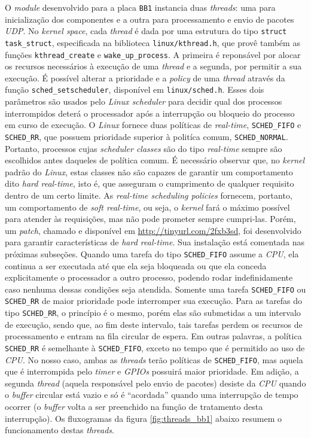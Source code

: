 O \textit{module} desenvolvido para a placa \texttt{BB1} instancia duas
\textit{threads}: uma para inicialização dos componentes e a outra para
processamento e envio de pacotes \textit{UDP}. No \textit{kernel space}, cada
\textit{thread} é dada por uma estrutura do tipo \texttt{struct task\_struct},
especificada na biblioteca \texttt{linux/kthread.h}, que provê também as funções
\texttt{kthread\_create} e \texttt{wake\_up\_process}. A primeira é reponsável
por alocar os recursos necessários à execução de uma \textit{thread} e a
segunda, por permitir a sua execução. É possível alterar a prioridade e a
\textit{policy} de uma \textit{thread} através da função
\texttt{sched\_setscheduler}, disponível em \texttt{linux/sched.h}. Esses dois
parâmetros são usados pelo \textit{Linux scheduler} para decidir qual dos
processos interrompidos deterá o processador após a interrupção ou bloqueio do
processo em curso de execução. O \textit{Linux} fornece duas políticas de
\textit{real-time}, \texttt{SCHED\_FIFO} e \texttt{SCHED\_RR}, que possuem
prioridade superior à politíca comum, \texttt{SCHED\_NORMAL}. Portanto,
processos cujas \textit{scheduler classes} são do tipo \textit{real-time} sempre
são escolhidos antes daqueles de política comum. É necessário observar que,  no
\textit{kernel} padrão do \textit{Linux},  estas classes não são capazes de garantir um comportamento dito \textit{hard
real-time}, isto é, que asseguram o cumprimento de qualquer requisito dentro de
um certo limite. As \textit{real-time scheduling policies} fornecem, portanto, um comportamento de \textit{soft real-time}, ou seja, o \textit{kernel} fará o
máximo possível para atender às requisições, mas não pode prometer sempre
cumpri-las. Porém, um \textit{patch}, chamado  e disponível em
\url{http://tinyurl.com/2fxb3sd}, foi desenvolvido para
garantir características de \textit{hard real-time}. Sua instalação está
comentada nas próximas subseções. Quando uma tarefa do tipo \texttt{SCHED\_FIFO}
assume a \textit{CPU}, ela continua a ser executada até que ela seja bloqueada ou que ela conceda explicitamente o processador a outro processo, podendo rodar
indefinidamente caso nenhuma dessas condições seja atendida. Somente uma tarefa
\texttt{SCHED\_FIFO} ou \texttt{SCHED\_RR} de maior prioridade pode interromper
sua execução. Para as tarefas do tipo \texttt{SCHED\_RR}, o princípio é o mesmo,
porém elas são submetidas a um intervalo de execução, sendo que, ao fim deste
intervalo, tais tarefas perdem os recursos de processamento e entram na fila
circular de espera. Em outras palavras, a política \texttt{SCHED\_RR} é
semelhante à \texttt{SCHED\_FIFO}, exceto no tempo que é permitido ao uso de
\textit{CPU}. No nosso caso, ambas as \textit{threads} terão políticas de
\texttt{SCHED\_FIFO}, mas aquela que é interrompida pelo \textit{timer} e
\textit{GPIOs} possuirá maior prioridade. Em adição, a segunda \textit{thread}
(aquela responsável pelo envio de pacotes) desiste da \textit{CPU} quando o
\textit{buffer} circular está vazio e só é ``acordada'' quando uma interrupção
de tempo ocorrer (o \textit{buffer} volta a ser preenchido na função de
tratamento desta interrupção). Os fluxogramas da figura \ref{fig:threads_bb1}
abaixo resumem o funcionamento destas \textit{threads}.

